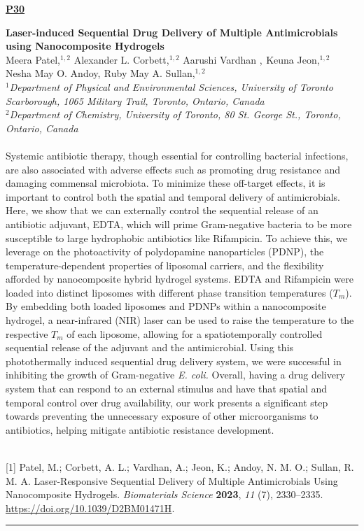 \documentclass[titlepage,oneside,openany,10pt]{book}
\newenvironment{posterabswref}[5] %
        {
        \newcommand{\posterref}{#5}
	\begin{flushright}
                \underline{\textbf{#4}}
        \end{flushright}
        \textbf{#1}\\%
        #2\\%
        \textit{#3}\\\\%
        }
        {
        \vspace{0.5cm}
        \\\noindent \posterref \\ \noindent\rule{15cm}{0.5pt}%
        }
\begin{document}
\begin{posterabswref}
	{Laser-induced Sequential Drug Delivery of Multiple Antimicrobials using Nanocomposite Hydrogels}
	{Meera Patel,$^{1,2}$ Alexander L. Corbett,$^{1,2}$ Aarushi Vardhan ,$^{}$ Keuna Jeon,$^{1,2}$ Nesha May O. Andoy,$^{}$ Ruby May A. Sullan,$^{1,2}$}
	{
	$^1$Department of Physical and Environmental Sciences, University of Toronto Scarborough, 1065 Military Trail, Toronto, Ontario, Canada\\
	$^2$Department of Chemistry, University of Toronto, 80 St. George St., Toronto, Ontario, Canada
	}
	{P30}
	{
	{[1]} Patel, M.; Corbett, A. L.; Vardhan, A.; Jeon, K.; Andoy, N. M. O.; Sullan, R. M. A. Laser-Responsive Sequential Delivery of Multiple Antimicrobials Using Nanocomposite Hydrogels. \emph{Biomaterials Science}  \textbf{2023}, \emph{11} (7), 2330--2335. \url{https://doi.org/10.1039/D2BM01471H}.
	}
	Systemic antibiotic therapy, though essential for controlling bacterial infections, are also associated with adverse effects such as promoting drug resistance and damaging commensal microbiota. To minimize these off-target effects, it is important to control both the spatial and temporal delivery of antimicrobials. Here, we show that we can externally control the sequential release of an antibiotic adjuvant, EDTA, which will prime Gram-negative bacteria to be more susceptible to large hydrophobic antibiotics like Rifampicin. To achieve this, we leverage on the photoactivity of polydopamine nanoparticles (PDNP), the temperature-dependent properties of liposomal carriers, and the flexibility afforded by nanocomposite hybrid hydrogel systems. EDTA and Rifampicin were loaded into distinct liposomes with different phase transition temperatures ($T_m$). By embedding both loaded liposomes and PDNPs within a nanocomposite hydrogel, a near-infrared (NIR) laser can be used to raise the temperature to the respective $T_m$ of each liposome, allowing for a spatiotemporally controlled sequential release of the adjuvant and the antimicrobial. Using this photothermally induced sequential drug delivery system, we were successful in inhibiting the growth of Gram-negative \emph{E. coli.} Overall, having a drug delivery system that can respond to an external stimulus and have that spatial and temporal control over drug availability, our work presents a significant step towards preventing the unnecessary exposure of other microorganisms to antibiotics, helping mitigate antibiotic resistance development.
	\label{VardhanA}
\end{posterabswref}
\end{document}
